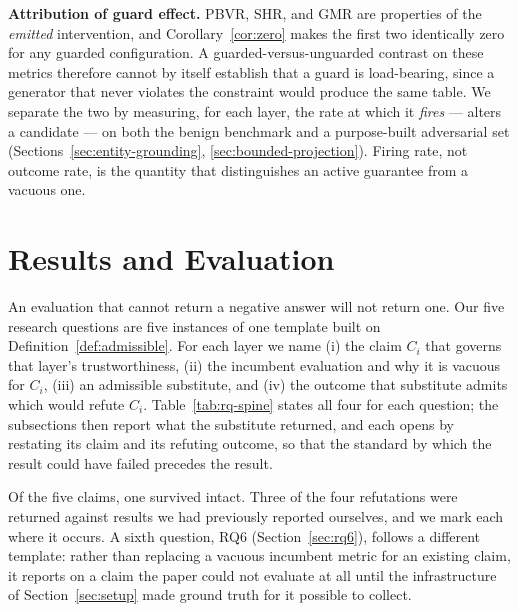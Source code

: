 \documentclass[journal, 10pt]{IEEEtran}
\begin{document}
\textbf{Attribution of guard effect.} PBVR, SHR, and GMR are properties of the \emph{emitted} intervention, and Corollary~\ref{cor:zero} makes the first two identically zero for any guarded configuration. A guarded-versus-unguarded contrast on these metrics therefore cannot by itself establish that a guard is load-bearing, since a generator that never violates the constraint would produce the same table. We separate the two by measuring, for each layer, the rate at which it \emph{fires} --- alters a candidate --- on both the benign benchmark and a purpose-built adversarial set (Sections~\ref{sec:entity-grounding}, \ref{sec:bounded-projection}). Firing rate, not outcome rate, is the quantity that distinguishes an active guarantee from a vacuous one.

\section{Results and Evaluation}
\label{sec:results}

An evaluation that cannot return a negative answer will not return one. Our five
research questions are five instances of one template built on
Definition~\ref{def:admissible}. For each layer we name (i) the claim $C_i$ that
governs that layer's trustworthiness, (ii) the incumbent evaluation and why it is
vacuous for $C_i$, (iii) an admissible substitute, and (iv) the outcome that
substitute admits which would refute $C_i$. Table~\ref{tab:rq-spine} states all
four for each question; the subsections then report what the substitute returned,
and each opens by restating its claim and its refuting outcome, so that the
standard by which the result could have failed precedes the result.

Of the five claims, one survived intact. Three of the four refutations were
returned against results we had previously reported ourselves, and we mark each
where it occurs. A sixth question, RQ6 (Section~\ref{sec:rq6}), follows a
different template: rather than replacing a vacuous incumbent metric for an
existing claim, it reports on a claim the paper could not evaluate at all
until the infrastructure of Section~\ref{sec:setup} made ground truth for it
possible to collect.
\end{document}

